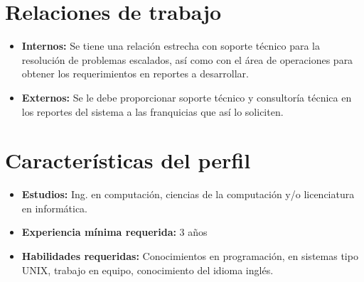 \section{Relaciones de trabajo}
\label{sec:rel_trabajo}


\begin{itemize}
 \item \textbf{Internos:} Se tiene una relación estrecha con soporte técnico para la resolución de problemas escalados, así como con el área de operaciones para obtener los requerimientos en reportes a desarrollar.
 \item \textbf{Externos:} Se le debe proporcionar soporte técnico y consultoría técnica en los reportes del sistema a las franquicias que así lo soliciten.
\end{itemize}

\section{Características del perfil}
\label{sec:pperfil}


\begin{itemize}
 \item \textbf{Estudios:} Ing. en computación, ciencias de la computación y/o licenciatura en informática.
 \item \textbf{Experiencia mínima requerida:} 3 años
 \item \textbf{Habilidades requeridas:} Conocimientos en programación, en sistemas tipo UNIX, trabajo en equipo, conocimiento del idioma inglés.
 \end{itemize}